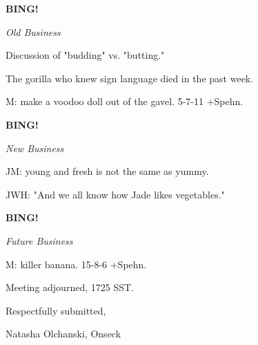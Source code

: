 \documentclass[12pt]{article}
\newcommand{\bing}{{\bf BING!} }
\newcommand{\goto}[1]{\bing \vskip 12pt \centerline{{\em{#1}}}}
\begin{document}
\goto{Old Business}

Discussion of "budding" vs. "butting."

The gorilla who knew sign language died in the past week.

M: make a voodoo doll out of the gavel. 5-7-11 +Spehn.

\goto{New Business}

JM: young and fresh is not the same as yummy.

JWH: "And we all know how Jade likes vegetables."

\goto{Future Business}

M: killer banana. 15-8-6 +Spehn.

\vspace{12pt}

\noindent
Meeting adjourned, 1725 SST.

\vspace{18pt}

\centerline{Respectfully submitted,}
\centerline{Natasha Olchanski, Onseck}
\end{document}
